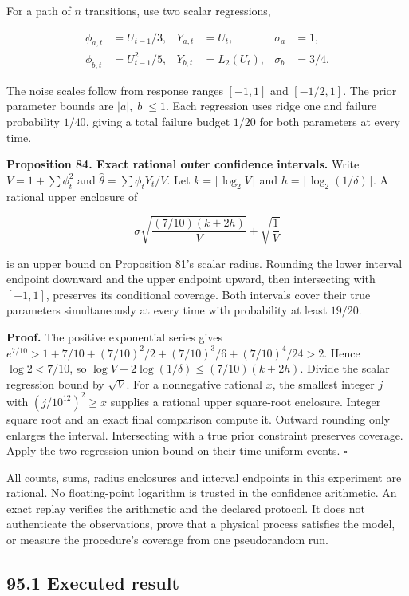 \documentclass[11pt,letterpaper]{article}
\begin{document}
For a path of \(n\) transitions, use two scalar regressions,

\[
\begin{aligned}
\phi_{a,t}&=U_{t-1}/3,&Y_{a,t}&=U_t,&\sigma_a&=1,\\
\phi_{b,t}&=U_{t-1}^2/5,&Y_{b,t}&=L_2(U_t),&\sigma_b&=3/4.
\end{aligned}
\]

The noise scales follow from response ranges \([-1,1]\) and
\([-1/2,1]\). The prior parameter bounds are \(|a|,|b|\leq1\). Each
regression uses ridge one and failure probability \(1/40\), giving a
total failure budget \(1/20\) for both parameters at every time.

\textbf{Proposition 84. Exact rational outer confidence intervals.}
Write \(V=1+\sum\phi_t^2\) and \(\widehat\theta=\sum\phi_tY_t/V\). Let
\(k=\lceil\log_2 V\rceil\) and \(h=\lceil\log_2(1/\delta)\rceil\). A
rational upper enclosure of

\[
\sigma\sqrt{\frac{(7/10)(k+2h)}{V}}+\sqrt{\frac1V}
\]

is an upper bound on Proposition 81's scalar radius. Rounding the lower
interval endpoint downward and the upper endpoint upward, then
intersecting with \([-1,1]\), preserves its conditional coverage. Both
intervals cover their true parameters simultaneously at every time with
probability at least \(19/20\).

\textbf{Proof.} The positive exponential series gives
\(e^{7/10}>1+7/10+(7/10)^2/2+(7/10)^3/6+(7/10)^4/24>2\). Hence
\(\log 2<7/10\), so \(\log V+2\log(1/\delta)\leq(7/10)(k+2h)\). Divide
the scalar regression bound by \(\sqrt V\). For a nonnegative rational
\(x\), the smallest integer \(j\) with \((j/10^{12})^2\geq x\) supplies
a rational upper square-root enclosure. Integer square root and an exact
final comparison compute it. Outward rounding only enlarges the
interval. Intersecting with a true prior constraint preserves coverage.
Apply the two-regression union bound on their time-uniform events.
\(\square\)

All counts, sums, radius enclosures and interval endpoints in this
experiment are rational. No floating-point logarithm is trusted in the
confidence arithmetic. An exact replay verifies the arithmetic and the
declared protocol. It does not authenticate the observations, prove that
a physical process satisfies the model, or measure the procedure's
coverage from one pseudorandom run.

\subsection{95.1 Executed result}\label{executed-result}
\end{document}
